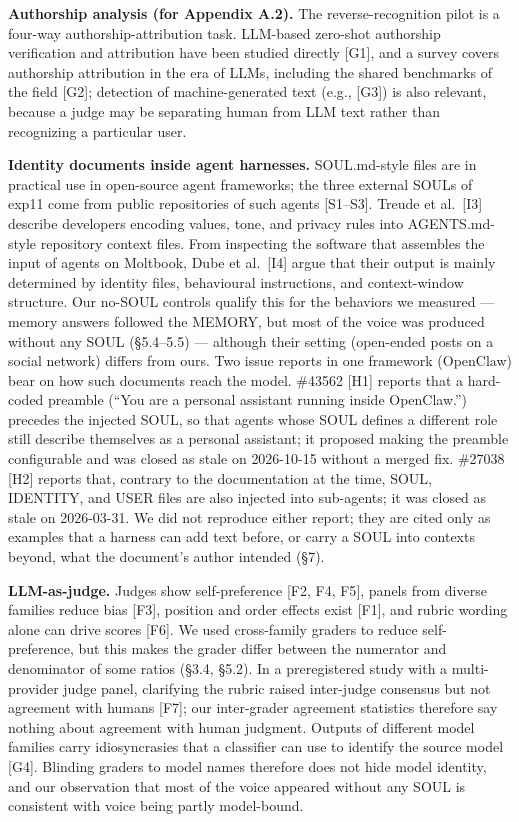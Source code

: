 \documentclass[10pt]{article}
\begin{document}
\textbf{Authorship analysis (for Appendix A.2).} The reverse-recognition pilot is a four-way authorship-attribution task. LLM-based zero-shot authorship verification and attribution have been studied directly {[}G1{]}, and a survey covers authorship attribution in the era of LLMs, including the shared benchmarks of the field {[}G2{]}; detection of machine-generated text (e.g., {[}G3{]}) is also relevant, because a judge may be separating human from LLM text rather than recognizing a particular user.

\textbf{Identity documents inside agent harnesses.} SOUL.md-style files are in practical use in open-source agent frameworks; the three external SOULs of exp11 come from public repositories of such agents {[}S1--S3{]}. Treude et al.~{[}I3{]} describe developers encoding values, tone, and privacy rules into AGENTS.md-style repository context files. From inspecting the software that assembles the input of agents on Moltbook, Dube et al.~{[}I4{]} argue that their output is mainly determined by identity files, behavioural instructions, and context-window structure. Our no-SOUL controls qualify this for the behaviors we measured --- memory answers followed the MEMORY, but most of the voice was produced without any SOUL (§5.4--5.5) --- although their setting (open-ended posts on a social network) differs from ours. Two issue reports in one framework (OpenClaw) bear on how such documents reach the model. \#43562 {[}H1{]} reports that a hard-coded preamble (``You are a personal assistant running inside OpenClaw.'') precedes the injected SOUL, so that agents whose SOUL defines a different role still describe themselves as a personal assistant; it proposed making the preamble configurable and was closed as stale on 2026-10-15 without a merged fix. \#27038 {[}H2{]} reports that, contrary to the documentation at the time, SOUL, IDENTITY, and USER files are also injected into sub-agents; it was closed as stale on 2026-03-31. We did not reproduce either report; they are cited only as examples that a harness can add text before, or carry a SOUL into contexts beyond, what the document's author intended (§7).

\textbf{LLM-as-judge.} Judges show self-preference {[}F2, F4, F5{]}, panels from diverse families reduce bias {[}F3{]}, position and order effects exist {[}F1{]}, and rubric wording alone can drive scores {[}F6{]}. We used cross-family graders to reduce self-preference, but this makes the grader differ between the numerator and denominator of some ratios (§3.4, §5.2). In a preregistered study with a multi-provider judge panel, clarifying the rubric raised inter-judge consensus but not agreement with humans {[}F7{]}; our inter-grader agreement statistics therefore say nothing about agreement with human judgment. Outputs of different model families carry idiosyncrasies that a classifier can use to identify the source model {[}G4{]}. Blinding graders to model names therefore does not hide model identity, and our observation that most of the voice appeared without any SOUL is consistent with voice being partly model-bound.
\end{document}
